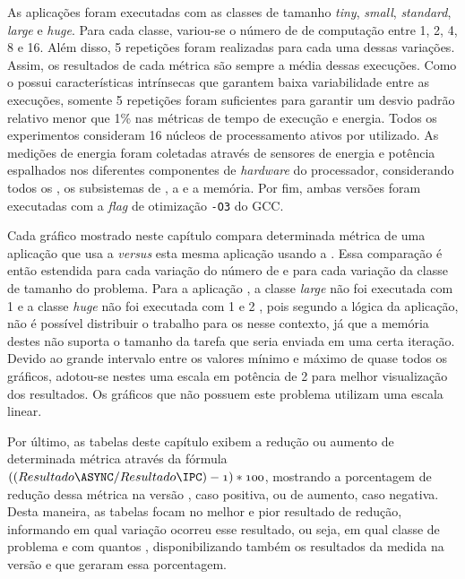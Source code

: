 As aplicações foram executadas com as classes de tamanho \textit{tiny}, \textit{small}, \textit{standard}, \textit{large} e \textit{huge}. Para cada classe, variou-se o número de \clusters de computação entre 1, 2, 4, 8 e 16. Além disso, 5 repetições foram realizadas para cada uma dessas variações. Assim, os resultados de cada métrica são sempre a média dessas execuções. Como o \mppa possui características intrínsecas que garantem baixa variabilidade entre as execuções, somente 5 repetições foram suficientes para garantir um desvio padrão relativo menor que 1\% nas métricas de tempo de execução e energia. Todos os experimentos consideram 16 núcleos de processamento ativos por \cluster utilizado. As medições de energia foram coletadas através de sensores de energia e potência espalhados nos diferentes componentes de \textit{hardware} do processador, considerando todos os \clusters, os subsistemas de \IO, a \NoC e a memória. Por fim, ambas versões foram executadas com a \textit{flag} de otimização \texttt{-O3} do GCC.

Cada gráfico mostrado neste capítulo compara determinada métrica de uma aplicação que usa a \API \ASYNC \textit{versus} esta mesma aplicação usando a \API \IPC. Essa comparação é então estendida para cada variação do número de \clusters e para cada variação da classe de tamanho do problema. Para a aplicação \KM, a classe \textit{large} não foi executada com 1 \cluster e a classe \textit{huge} não foi executada com 1 e 2 \clusters, pois segundo a lógica da aplicação, não é possível distribuir o trabalho para os \clusters nesse contexto, já que a memória destes não suporta o tamanho da tarefa que seria enviada em uma certa iteração. Devido ao grande intervalo entre os valores mínimo e máximo de quase todos os gráficos, adotou-se nestes uma escala em potência de 2 para melhor visualização dos resultados. Os gráficos que não possuem este problema utilizam uma escala linear.

Por último, as tabelas deste capítulo exibem a redução ou aumento de determinada métrica através da fórmula $\mathnormal{((Resultado \ASYNC / Resultado \IPC) - 1) * 100}$, mostrando a porcentagem de redução dessa métrica na versão \ASYNC, caso positiva, ou de aumento, caso negativa. Desta maneira, as tabelas focam no melhor e pior resultado de redução, informando em qual variação ocorreu esse resultado, ou seja, em qual classe de problema e com quantos \clusters, disponibilizando também os resultados da medida na versão \IPC e \ASYNC que geraram essa porcentagem.


